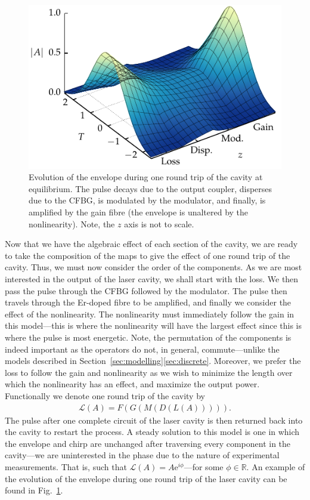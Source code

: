 \documentclass[9pt,twocolumn,twoside]{osajnl}
\begin{document}
\begin{figure}[tbp]
	\centering
	\includegraphics{Figures/Evo}
	\caption{Evolution of the envelope during one round trip of the cavity at equilibrium. The pulse decays due to the output coupler, disperses due to the CFBG, is modulated by the modulator, and finally, is amplified by the gain fibre (the envelope is unaltered by the nonlinearity). Note, the $z$ axis is not to scale.}
	\label{fig:cavityevo}
\end{figure}

Now that we have the algebraic effect of each section of the cavity, we are ready to take the composition of the maps to give the effect of one round trip of the cavity. Thus, we must now consider the order of the components. As we are most interested in the output of the laser cavity, we shall start with the loss. We then pass the pulse through the CFBG followed by the modulator. The pulse then travels through the Er-doped fibre to be amplified, and finally we consider the effect of the nonlinearity. The nonlinearity must immediately follow the gain in this model---this is where the nonlinearity will have the largest effect since this is where the pulse is most energetic. Note, the permutation of the components is indeed important as the operators do not, in general, commute---unlike the models described in Section~\ref{sec:modelling}\ref{sec:discrete}. Moreover, we prefer the loss to follow the gain and nonlinearity as we wish to minimize the length over which the nonlinearity has an effect, and maximize the output power. Functionally we denote one round trip of the cavity by
\begin{align}
	\mathcal{L}(A) = F(G(M(D(L(A))))).
	\label{eq:order}
\end{align}
 The pulse after one complete circuit of the laser cavity is then returned back into the cavity to restart the process. A steady solution to this model is one in which the envelope and chirp are unchanged after traversing every component in the cavity---we are uninterested in the phase due to the nature of experimental measurements. That is, such that $\mathcal{L}(A) = A \textrm{e}^{i \phi}$---for some $\phi \in \mathbb{R}$. An example of the evolution of the envelope during one round trip of the laser cavity can be found in Fig.~\ref{fig:cavityevo}.
\end{document}
